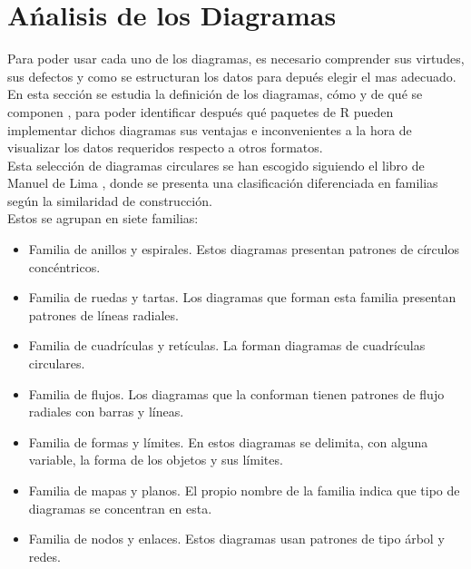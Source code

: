 \documentclass{article}\usepackage[]{graphicx}\usepackage[]{color}
\begin{document}
\section{A\'nalisis de los Diagramas}\label{sec:Analisis}
Para poder usar cada uno de los diagramas, es necesario comprender sus virtudes, sus defectos y como se estructuran los datos para depu\'es elegir el mas adecuado.~\\
En esta secci\'on se estudia la definici\'on de los diagramas, c\'omo y de qu\'e se componen , para poder identificar despu\'es qu\'e paquetes de R pueden implementar dichos diagramas sus ventajas e inconvenientes a la hora de visualizar los datos requeridos respecto a otros formatos.~\\
Esta selecci\'on de diagramas circulares se han escogido siguiendo el libro de Manuel de Lima %
, donde se presenta una clasificaci\'on diferenciada en familias seg\'un la similaridad de construcci\'on.~\\ Estos se agrupan en siete familias:
\begin{itemize}
\item Familia de anillos y espirales. Estos diagramas presentan patrones de c\'irculos conc\'entricos.
\item Familia de ruedas y tartas. Los diagramas que forman esta familia presentan patrones de l\'ineas radiales.
\item Familia de cuadr\'iculas y ret\'iculas. La forman diagramas de cuadr\'iculas circulares.
\item Familia de flujos. Los diagramas que la conforman tienen patrones de flujo radiales con barras y l\'ineas.
\item Familia de formas y l\'imites. En estos diagramas se delimita, con alguna variable, la forma de los objetos y sus l\'imites.
\item Familia de mapas y planos. El propio nombre de la familia indica que tipo de diagramas se concentran en esta.
\item Familia de nodos y enlaces. Estos diagramas usan patrones de tipo \'arbol y redes.
\end{itemize}
\end{document}
